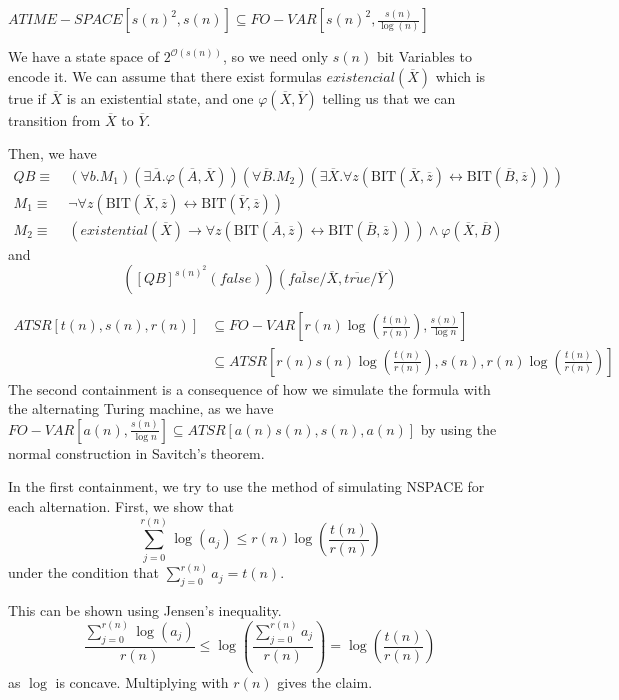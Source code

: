 \(ATIME-SPACE[s(n)^2, s(n)] \subseteq FO-VAR\left[ s(n)^2, \frac{s(n)}{\log(n)} \right]\)

We have a state space of \(2^{\mathcal{O}(s(n))}\), so we need only
\(s(n)\) bit Variables to encode it. We can assume that there exist
formulas \(existencial(\overline{X})\) which is true if \(\overline{X}\)
is an existential state, and one \(\varphi(\overline{X}, \overline{Y})\)
telling us that we can transition from \(\overline{X}\) to
\(\overline{Y}\).

Then, we have \[
\begin{aligned}
QB \equiv~&(\forall b.M_{1})(\exists\overline{A}.\varphi(\overline{A}, \overline{X}))(\forall \overline{B}.M_{2})(\exists \overline{X}. \forall z(\text{BIT}(\overline{X}, \overline{z}) \leftrightarrow \text{BIT}(\overline{B}, \overline{z}))) \\
M_{1} \equiv~&\neg\forall z(\text{BIT}(\overline{X}, \overline{z}) \leftrightarrow \text{BIT}(\overline{Y}, \overline{z})) \\
M_{2} \equiv~& (existential(\overline{X}) \to \forall z(\text{BIT}(\overline{A}, \overline{z}) \leftrightarrow \text{BIT}(\overline{B}, \overline{z}))) \land \varphi(\overline{X}, \overline{B})
\end{aligned}
\] and \[
\left([QB]^{s(n)^2}(false)\right)(\overline{false} / \overline{X}, \overline{true} / \overline{Y})
\]

\[
    \begin{aligned}
        ATSR[t(n), s(n), r(n)] &\subseteq FO-VAR\left[ r(n)\log\left( \frac{t(n)}{r(n)} \right), \frac{s(n)}{\log n} \right] \\ &\subseteq ATSR\left[r(n)s(n)\log\left(\frac{t(n)}{r(n)}\right), s(n), r(n)\log\left( \frac{t(n)}{r(n)} \right)\right]
    \end{aligned}
\]
The second containment is a consequence of how we simulate the formula
with the alternating Turing machine, as we have
\(FO-VAR\left[ a(n), \frac{s(n)}{\log n} \right] \subseteq ATSR[a(n)s(n), s(n), a(n)]\)
by using the normal construction in Savitch's theorem.

In the first containment, we try to use the method of simulating NSPACE
for each alternation. First, we show that \[
\sum_{j = 0}^{r(n)}\log(a_{j}) \leq r(n)\log\left( \frac{t(n)}{r(n)} \right)
\] under the condition that \(\sum_{j= 0}^{r(n)}a_{j} = t(n)\).

This can be shown using Jensen's inequality. \[
\frac{\sum_{j = 0}^{r(n)}\log(a_{j})}{r(n)} \leq \log\left( \frac{\sum_{j= 0}^{r(n)}a_{j}}{r(n)} \right) = \log\left( \frac{t(n)}{r(n)} \right)
\] as \(\log\) is concave. Multiplying with \(r(n)\) gives the claim.

